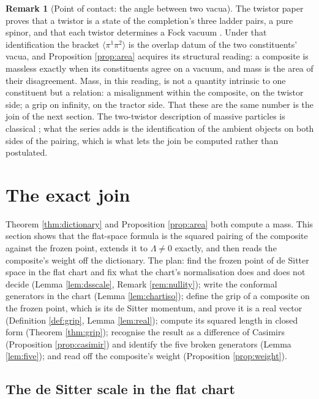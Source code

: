 \documentclass[11pt]{article}
\theoremstyle{definition}
\newtheorem{remark}[theorem]{Remark}
\newcommand{\br}[1]{\langle #1\rangle}
\begin{document}
\begin{remark}[Point of contact: the angle between two vacua]\label{rem:vacua}
The twistor paper proves that a twistor is a state of the completion's three ladder pairs, a pure spinor, and that each twistor determines a Fock vacuum \cite[Thm.~5.3]{ButlerT9}. Under that identification the bracket $\br{\pi^{1}\pi^{2}}$ is the overlap datum of the two constituents' vacua, and Proposition \ref{prop:area} acquires its structural reading: a composite is massless exactly when its constituents agree on a vacuum, and mass is the area of their disagreement. Mass, in this reading, is not a quantity intrinsic to one constituent but a relation: a misalignment within the composite, on the twistor side; a grip on infinity, on the tractor side. That these are the same number is the join of the next section. The two-twistor description of massive particles is classical \cite{PenroseRindler1986, Hughston1979}; what the series adds is the identification of the ambient objects on both sides of the pairing, which is what lets the join be computed rather than postulated.
\end{remark}

\section{The exact join}\label{sec:join}

Theorem \ref{thm:dictionary} and Proposition \ref{prop:area} both compute a mass. This section shows that the flat-space formula is the squared pairing of the composite against the frozen point, extends it to $\Lambda \neq 0$ exactly, and then reads the composite's weight off the dictionary. The plan: find the frozen point of de Sitter space in the flat chart and fix what the chart's normalisation does and does not decide (Lemma \ref{lem:dsscale}, Remark \ref{rem:nullity}); write the conformal generators in the chart (Lemma \ref{lem:chartiso}); define the grip of a composite on the frozen point, which is its de Sitter momentum, and prove it is a real vector (Definition \ref{def:grip}, Lemma \ref{lem:real}); compute its squared length in closed form (Theorem \ref{thm:grip}); recognise the result as a difference of Casimirs (Proposition \ref{prop:casimir}) and identify the five broken generators (Lemma \ref{lem:five}); and read off the composite's weight (Proposition \ref{prop:weight}).

\subsection{The de Sitter scale in the flat chart}
\end{document}
